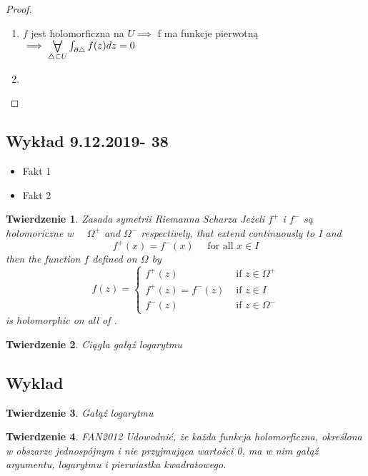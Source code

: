 \documentclass{article}
\theoremstyle{plain}
\newtheorem*{theorem}{Twierdzenie}
\theoremstyle{definition}
\theoremstyle{remark}
\newcommand{\Forall}[1]{\mathop{\vcenter{\hbox{\LARGE$\forall$}}}\limits_{#1}} %
\begin{document}
\begin{proof}
 \begin{enumerate}
     \item $f$ jest holomorficzna na $U \implies$ f ma funkcje pierwotną $\implies \Forall{\bigtriangleup \subset U} \int_{\partial \bigtriangleup} f(z)dz = 0$
     \item {}
 \end{enumerate}
\end{proof}

\subsection{Wykład 9.12.2019- 38}

\begin{itemize}
    \item Fakt 1
    \item Fakt 2
\end{itemize}

\begin{theorem}{Zasada symetrii Riemanna Scharza}
Jeżeli $f^{+}$ i $f^{-}$ są holomoriczne w $\quad \Omega^{+}$ and $\Omega^{-}$ respectively, that extend continuously to I and
\[
f^{+}(x)=f^{-}(x) \quad \text { for all } x \in I
\]
then the function $f$ defined on $\Omega$ by
\[
f(z)=\left\{\begin{array}{ll}
{f^{+}(z)} & {\text { if } z \in \Omega^{+}} \\
{f^{+}(z)=f^{-}(z)} & {\text { if } z \in I} \\
{f^{-}(z)} & {\text { if } z \in \Omega^{-}}
\end{array}\right.
\]
is holomorphic on all of \Omega.
\end{theorem}

\begin{theorem}{Ciągła gałąź logarytmu}
                        
\end{theorem}


\subsection{Wyklad }
\begin{theorem}{Gałąź logarytmu}

\end{theorem}

\begin{theorem}{FAN2012}
Udowodnić, że każda funkcja holomorficzna, określona w obszarze jednospójnym i nie przyjmująca wartości 0, ma w nim gałąź argumentu, logarytmu i pierwiastka kwadratowego.
\end{theorem}
\end{document}
